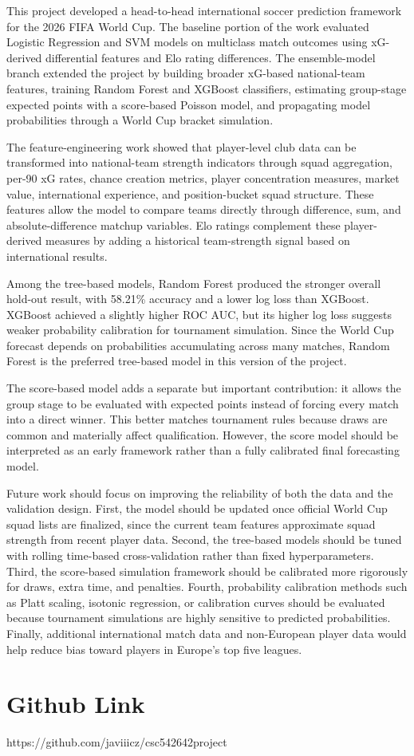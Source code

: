 \documentclass[11pt]{article}
\begin{document}
This project developed a head-to-head international soccer prediction framework for the 2026 FIFA World Cup. The baseline portion of the work evaluated Logistic Regression and SVM models on multiclass match outcomes using xG-derived differential features and Elo rating differences. The ensemble-model branch extended the project by building broader xG-based national-team features, training Random Forest and XGBoost classifiers, estimating group-stage expected points with a score-based Poisson model, and propagating model probabilities through a World Cup bracket simulation.

The feature-engineering work showed that player-level club data can be transformed into national-team strength indicators through squad aggregation, per-90 xG rates, chance creation metrics, player concentration measures, market value, international experience, and position-bucket squad structure. These features allow the model to compare teams directly through difference, sum, and absolute-difference matchup variables. Elo ratings complement these player-derived measures by adding a historical team-strength signal based on international results.

Among the tree-based models, Random Forest produced the stronger overall hold-out result, with 58.21\% accuracy and a lower log loss than XGBoost. XGBoost achieved a slightly higher ROC AUC, but its higher log loss suggests weaker probability calibration for tournament simulation. Since the World Cup forecast depends on probabilities accumulating across many matches, Random Forest is the preferred tree-based model in this version of the project.

The score-based model adds a separate but important contribution: it allows the group stage to be evaluated with expected points instead of forcing every match into a direct winner. This better matches tournament rules because draws are common and materially affect qualification. However, the score model should be interpreted as an early framework rather than a fully calibrated final forecasting model.

Future work should focus on improving the reliability of both the data and the validation design. First, the model should be updated once official World Cup squad lists are finalized, since the current team features approximate squad strength from recent player data. Second, the tree-based models should be tuned with rolling time-based cross-validation rather than fixed hyperparameters. Third, the score-based simulation framework should be calibrated more rigorously for draws, extra time, and penalties. Fourth, probability calibration methods such as Platt scaling, isotonic regression, or calibration curves should be evaluated because tournament simulations are highly sensitive to predicted probabilities. Finally, additional international match data and non-European player data would help reduce bias toward players in Europe's top five leagues.


\section{Github Link}
https://github.com/javiiicz/csc542642project



\end{document}

